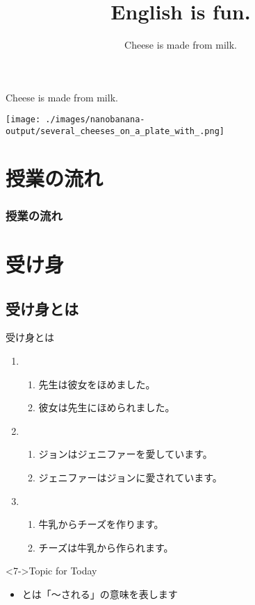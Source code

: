 \documentclass[aspectratio=169,xcolor={dvipsnames,table}]{beamer}
\title{English is fun.}
\subtitle{Cheese is made from milk.}
\author{}
\institute[]{}
\date[]
\begin{document}
\begin{frame}[plain]
  \titlepage
\end{frame}
\begin{frame}[plain]{Cheese is made from milk.}
 
\texttt{[image: ./images/nanobanana-output/several\_cheeses\_on\_a\_plate\_with\_.png]}
\end{frame}
\section*{授業の流れ}
\begin{frame}[plain]
  \frametitle{授業の流れ}
  \tableofcontents
\end{frame}
\section{受け身}
\subsection{受け身とは}
\begin{frame}[plain]{受け身とは}
 \Large

\begin{enumerate}
 \item<1-> \begin{enumerate}
	\item<1-> 先生は彼女をほめました。
	\item<2-> 彼女は先生にほめられました。
       \end{enumerate}
 \item<3-> \begin{enumerate}
	\item<3-> ジョンはジェニファーを愛しています。
	\item<4-> ジェニファーはジョンに愛されています。
       \end{enumerate}
 \item<5-> \begin{enumerate}
	\item<5-> 牛乳からチーズを作ります。
	\item<6-> チーズは牛乳から作られます。
       \end{enumerate}
\end{enumerate}

\begin{block}<7->{Topic for Today}
\begin{itemize}[square]\small
 \item {}とは「〜される」の意味を表します
\end{itemize}
     \end{block}
\end{frame}
\end{document}
